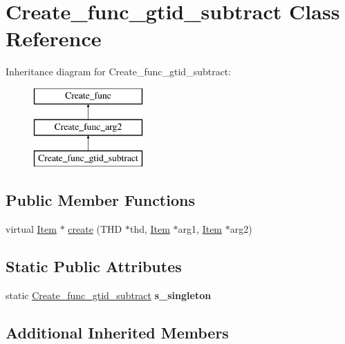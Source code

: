 \hypertarget{classCreate__func__gtid__subtract}{}\section{Create\+\_\+func\+\_\+gtid\+\_\+subtract Class Reference}
\label{classCreate__func__gtid__subtract}
Inheritance diagram for Create\+\_\+func\+\_\+gtid\+\_\+subtract\+:\begin{figure}[H]
\begin{center}
\leavevmode
\includegraphics[height=3.000000cm]{classCreate__func__gtid__subtract}
\end{center}
\end{figure}
\subsection*{Public Member Functions}
\begin{DoxyCompactItemize}
\item 
virtual \mbox{\hyperlink{classItem}{Item}} $\ast$ \mbox{\hyperlink{classCreate__func__gtid__subtract_a25705d6634dd5d2ba9ae9217665964cf}{create}} (T\+HD $\ast$thd, \mbox{\hyperlink{classItem}{Item}} $\ast$arg1, \mbox{\hyperlink{classItem}{Item}} $\ast$arg2)
\end{DoxyCompactItemize}
\subsection*{Static Public Attributes}
\begin{DoxyCompactItemize}
\item 
\mbox{\label{classCreate__func__gtid__subtract_a3f829172dc598e4646ac01f50ccbf0b2}} 
static \mbox{\hyperlink{classCreate__func__gtid__subtract}{Create\+\_\+func\+\_\+gtid\+\_\+subtract}} {\bfseries s\+\_\+singleton}
\end{DoxyCompactItemize}
\subsection*{Additional Inherited Members}


